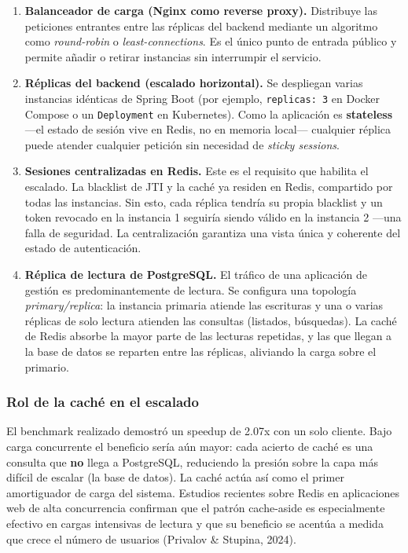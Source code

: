 \documentclass[12pt]{article}
\begin{document}
	\begin{enumerate}
		\item \textbf{Balanceador de carga (Nginx como reverse proxy).} Distribuye las peticiones entrantes entre las réplicas del backend mediante un algoritmo como \textit{round-robin} o \textit{least-connections}. Es el único punto de entrada público y permite añadir o retirar instancias sin interrumpir el servicio.
		\item \textbf{Réplicas del backend (escalado horizontal).} Se despliegan varias instancias idénticas de Spring Boot (por ejemplo, \texttt{replicas: 3} en Docker Compose o un \texttt{Deployment} en Kubernetes). Como la aplicación es \textbf{stateless} —el estado de sesión vive en Redis, no en memoria local— cualquier réplica puede atender cualquier petición sin necesidad de \textit{sticky sessions}.
		\item \textbf{Sesiones centralizadas en Redis.} Este es el requisito que habilita el escalado. La blacklist de JTI y la caché ya residen en Redis, compartido por todas las instancias. Sin esto, cada réplica tendría su propia blacklist y un token revocado en la instancia 1 seguiría siendo válido en la instancia 2 —una falla de seguridad. La centralización garantiza una vista única y coherente del estado de autenticación.
		\item \textbf{Réplica de lectura de PostgreSQL.} El tráfico de una aplicación de gestión es predominantemente de lectura. Se configura una topología \textit{primary/replica}: la instancia primaria atiende las escrituras y una o varias réplicas de solo lectura atienden las consultas (listados, búsquedas). La caché de Redis absorbe la mayor parte de las lecturas repetidas, y las que llegan a la base de datos se reparten entre las réplicas, aliviando la carga sobre el primario.
	\end{enumerate}
	
	\subsubsection*{Rol de la caché en el escalado}
	
	El benchmark realizado demostró un speedup de 2.07x con un solo cliente. Bajo carga concurrente el beneficio sería aún mayor: cada acierto de caché es una consulta que \textbf{no} llega a PostgreSQL, reduciendo la presión sobre la capa más difícil de escalar (la base de datos). La caché actúa así como el primer amortiguador de carga del sistema. Estudios recientes sobre Redis en aplicaciones web de alta concurrencia confirman que el patrón cache-aside es especialmente efectivo en cargas intensivas de lectura y que su beneficio se acentúa a medida que crece el número de usuarios (Privalov \& Stupina, 2024).
	
\end{document}
